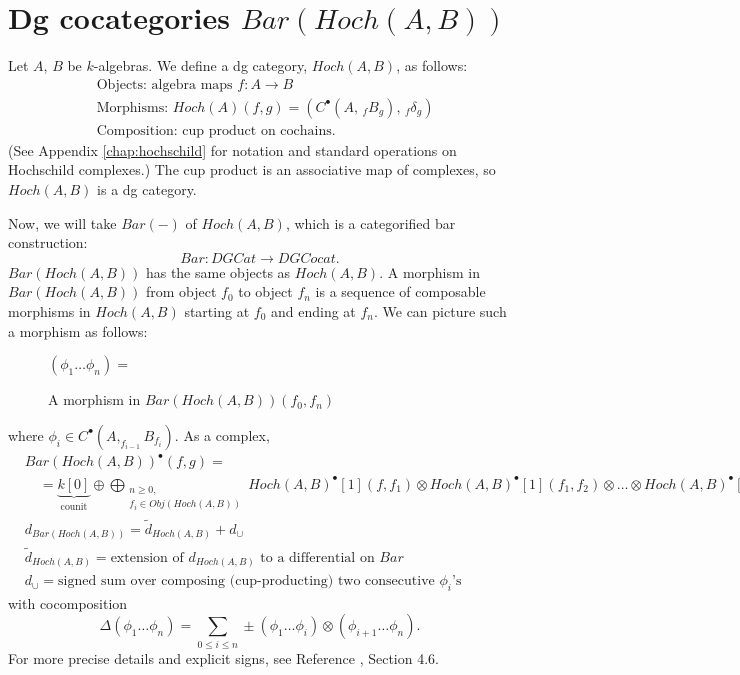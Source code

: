 \section{Dg cocategories $Bar(Hoch(A,B))$} \label{sec:define_bar_hoch}
Let $A$, $B$ be $k$-algebras. We define 
a dg category, $Hoch(A,B)$, as follows:
\begin{align*}
	&\textrm{Objects: algebra maps } f:A \to B\\
	&\textrm{Morphisms: } 
	  Hoch(A)(f,g) = (C^\bullet(A,\, _fB_g),\, _f\delta_g)\\
	&\textrm{Composition: cup product on cochains.}
\end{align*}
(See Appendix \ref{chap:hochschild} for notation and 
standard operations on Hochschild complexes.) 
The cup product is an associative map of complexes, 
so $Hoch(A,B)$ is a dg category.

Now, we will take $Bar(-)$ of $Hoch(A,B)$, which 
is a categorified bar construction:
$$Bar: DGCat \to DGCocat.$$
$Bar(Hoch(A,B))$ has the same objects as 
$Hoch(A,B)$. A morphism in $Bar(Hoch(A,B))$ 
from object $f_0$ to object $f_n$ 
is a sequence of composable morphisms in 
$Hoch(A,B)$ starting at $f_0$ and ending at 
$f_n$. We can picture such a morphism as 
follows:
%
\begin{figure}[H]
\centerline{
$(\phi_1 \dots \phi_n) = $
}
\caption{A morphism in $Bar(Hoch(A,B))(f_0,f_n)$}
\end{figure}
%
where $\phi_i \in C^\bullet(A, _{f_{i-1}}B_{f_i})$. 
As a complex, 
\begin{align*}
&Bar(Hoch(A,B))^\bullet(f,g) 
=\\
&\quad = \underbrace{k[0]}_{\textrm{counit}} \oplus
\bigoplus \limits_{\substack{
	n \geq 0,\\
	f_i \in Obj(Hoch(A,B))}}
{\scriptstyle Hoch(A,B)^\bullet[1](f,f_1) \otimes 
Hoch(A,B)^\bullet[1](f_1,f_2) \otimes \dots \otimes 
Hoch(A,B)^\bullet[1](f_n,g)}\\
%
& d_{Bar(Hoch(A,B))} = 
\tilde{d}_{Hoch(A,B)} + d_\cup\\
%
& \tilde{d}_{Hoch(A,B)} =
\textrm{extension of $d_{Hoch(A,B)}$ 
to a differential on $Bar$}\\
%
& d_\cup = 
\textrm{signed sum over composing (cup-producting) 
two consecutive $\phi_i$'s}
\end{align*}
with cocomposition
$$\Delta(\phi_1\dots \phi_n) = 
\sum \limits_{0 \leq i \leq n}
\pm (\phi_1 \dots \phi_i) \otimes (\phi_{i+1}\dots \phi_n).$$
%
For more precise details and explicit signs, 
see Reference \cite{T}, Section 4.6.